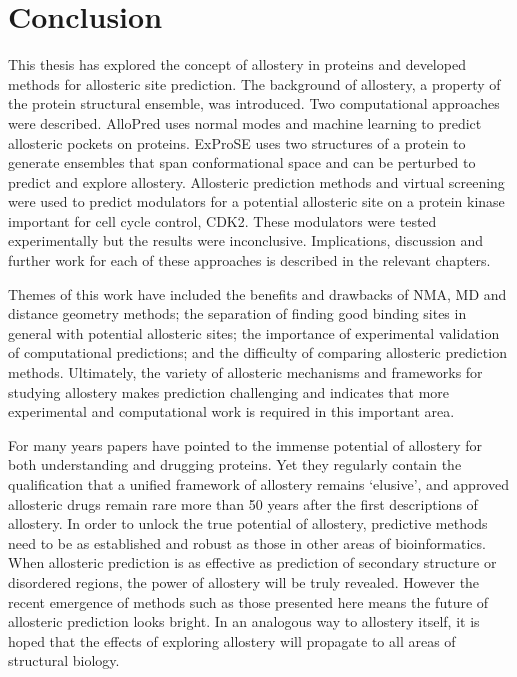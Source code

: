 \chapter{Conclusion}
\label{cha:conclusion}

This thesis has explored the concept of allostery in proteins and developed methods for allosteric site prediction.
The background of allostery, a property of the protein structural ensemble, was introduced.
Two computational approaches were described.
AlloPred uses normal modes and machine learning to predict allosteric pockets on proteins.
ExProSE uses two structures of a protein to generate ensembles that span conformational space and can be perturbed to predict and explore allostery.
Allosteric prediction methods and virtual screening were used to predict modulators for a potential allosteric site on a protein kinase important for cell cycle control, CDK2.
These modulators were tested experimentally but the results were inconclusive.
Implications, discussion and further work for each of these approaches is described in the relevant chapters.

Themes of this work have included the benefits and drawbacks of NMA, MD and distance geometry methods; the separation of finding good binding sites in general with potential allosteric sites; the importance of experimental validation of computational predictions; and the difficulty of comparing allosteric prediction methods.
Ultimately, the variety of allosteric mechanisms and frameworks for studying allostery makes prediction challenging and indicates that more experimental and computational work is required in this important area.

For many years papers have pointed to the immense potential of allostery for both understanding and drugging proteins.
Yet they regularly contain the qualification that a unified framework of allostery remains `elusive', and approved allosteric drugs remain rare more than 50 years after the first descriptions of allostery.
In order to unlock the true potential of allostery, predictive methods need to be as established and robust as those in other areas of bioinformatics.
When allosteric prediction is as effective as prediction of secondary structure or disordered regions, the power of allostery will be truly revealed.
However the recent emergence of methods such as those presented here means the future of allosteric prediction looks bright.
In an analogous way to allostery itself, it is hoped that the effects of exploring allostery will propagate to all areas of structural biology.

